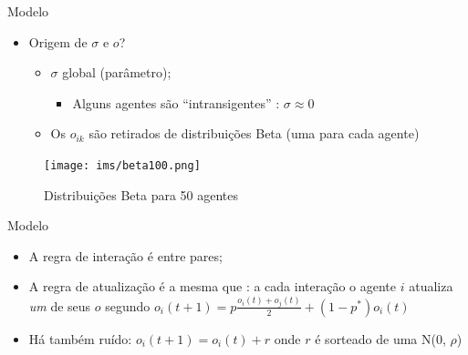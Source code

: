 \documentclass{beamer}
\begin{document}
\begin{frame}{Modelo}
  \begin{itemize}
  \item Origem de \(\sigma\) e \(o\)?
    \begin{itemize}
    \item \(\sigma\) global (parâmetro);
      \begin{itemize}
      \item Alguns agentes são ``intransigentes'' : \(\sigma \approx 0\)
      \end{itemize}
    \item Os \(o_{ik}\) são retirados de distribuições Beta (uma para cada agente)
    \end{itemize}
  \end{itemize}
\end{frame}

\begin{frame}
      
\begin{figure}[H]
  \centering
\caption{Distribuições Beta para 50 agentes}
  \texttt{[image: ims/beta100.png]}
  \label{fig:betas100}
\end{figure}
\end{frame}

    \begin{frame}{Modelo}
      \begin{itemize}
      \item A regra de interação é entre pares;
      \item A regra de atualização é a mesma que \textcite{martins2009bayesian}:
        a cada interação o agente \(i\) atualiza  \textit{um} de seus \(o\)
        segundo \( o_i(t+1) = p \frac{o_i(t) + o_j(t)}{2} + (1-p^*)o_i(t) \)
      \item Há também ruído: \(o_i(t+1) = o_i(t) + r\) onde \(r\) é sorteado de
        uma N(0, \(\rho \))
  \end{itemize}
\end{frame}
\end{document}
